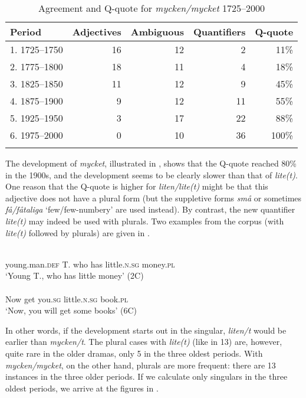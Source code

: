 \documentclass[output=paper]{langscibook}
\begin{document}
\begin{table}
\caption{Agreement and Q-quote for \textit{mycken/mycket} 1725–2000}
\label{tab:delsing:4}
\begin{tabular}{lrrrr}
\lsptoprule
Period & Adjectives & Ambiguous & Quantifiers & Q-quote\\
\midrule
1. 1725–1750 & 16 & 12 & 2 & 11\%\\
2. 1775–1800 & 18 & 11 & 4 & 18\%\\
3. 1825–1850 & 11 & 12 & 9 & 45\%\\
4. 1875–1900 & 9 & 12 & 11 & 55\%\\
5. 1925–1950 & 3 & 17 & 22 & 88\%\\
6. 1975–2000 & 0 & 10 & 36 & 100\%\\
\lspbottomrule
\end{tabular}
\end{table}

The development of \textit{mycket}, illustrated in , shows that the Q-quote reached 80\% in the 1900s, and the development seems to be clearly slower than that of \textit{lite(t)}. One reason that the Q-quote is higher for \textit{liten/lite(t)} might be that this adjective does not have a plural form (but the suppletive forms \textit{små} or sometimes \textit{få/fåtaliga} ‘few/few-numbery’ are used instead). By contrast, the new quantifier \textit{lite(t)} may indeed be used with plurals. Two examples from the corpus (with \textit{lite(t)} followed by plurals) are given in .


\ea\label{ex:delsing:13}
 \\   young.man\textsc{.def}  T.               who     has   little.\textsc{n.sg}  money.\textsc{pl}\\
  \textsc{‘}Young T., who has little money’ (2C)\\
\\
  Now  get     you\textsc{.sg}     little.\textsc{n.sg}   book.\textsc{pl}\\
  ‘Now, you will get some books’ (6C)\\
\z
\z


In other words, if the development starts out in the singular, \textit{liten/t} would be earlier than \textit{mycken/t}. The plural cases with \textit{lite(t)} (like in 13) are, however, quite rare in the older dramas, only 5 in the three oldest periods. With \textit{mycken/mycket}, on the other hand, plurals are more frequent: there are 13 instances in the three older periods. If we calculate only singulars in the three oldest periods, we arrive at the figures in .
\end{document}
